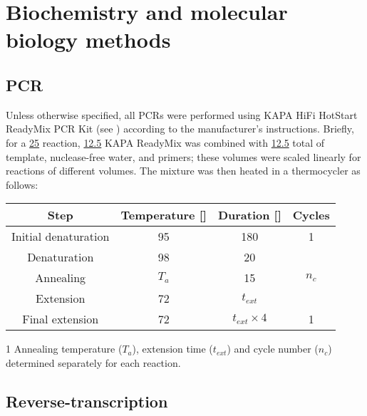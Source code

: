 \section{Biochemistry and molecular biology methods}

\subsection{PCR}
\label{sec:methods_pcr}


Unless otherwise specified, all PCRs were performed using  KAPA HiFi HotStart ReadyMix PCR Kit (see ) according to the manufacturer's instructions. Briefly, for a \ul{25} reaction, \ul{12.5} KAPA ReadyMix was combined with \ul{12.5} total of template, nuclease-free water, and primers; these volumes were scaled linearly for reactions of different volumes. The mixture was then heated in a thermocycler as follows:

\begin{center}
\begin{threeparttable}
\begin{tabular}{cccc}\toprule
\textbf{Step} & \textbf{Temperature [\degC{}]} & \textbf{Duration [\secs{}]} & \textbf{Cycles}\\\midrule
Initial denaturation & 95 & 180 & 1 \\\midrule
Denaturation & 98 & 20 & \multirow{3}{*}{$n_c$\tnote{1}}\\
Annealing & $T_a$\tnote{1} \tnote{} & 15 & \\
Extension & 72 & $t_{ext}$\tnote{1} & \\\midrule
Final extension & 72 & $t_{ext} \times 4$\tnote{1} & 1\\
\end{tabular}
\begin{tablenotes}
\item[1] Annealing temperature ($T_a$), extension time ($t_{ext}$) and cycle number ($n_c$) determined separately for each reaction.
\end{tablenotes}
\end{threeparttable}
\end{center}

\subsection{Reverse-transcription}
\label{sec:methods_rt}

